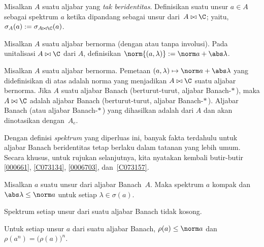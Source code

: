 \begin{defn}\label{00150014} Misalkan $A$ suatu aljabar yang \emph{tak beridentitas}. Definisikan
 suatu unsur $a \in A$ sebagai spektrum $a$ ketika dipandang sebagai unsur
dari~$A \bowtie \C$; yaitu, $\sigma_A(a) := \sigma_{A \bowtie \C}(a)$.
\end{defn}

\begin{defn}\label{00150015} Misalkan $A$ suatu aljabar bernorma (dengan atau tanpa involusi). Pada
unitalisasi $A \bowtie \C$ dari $A$, definisikan $\norm{(a,\lambda)} := \norm a + \abs\lambda$.
\end{defn}

\begin{prop}\label{001500151} Misalkan $A$ suatu aljabar bernorma. Pemetaan
$(a,\lambda) \mapsto \norm a + \abs\lambda$ yang didefinisikan di atas adalah norma yang
menjadikan $A \bowtie \C$ suatu aljabar bernorma. Jika $A$ suatu aljabar Banach (berturut-turut,
aljabar Banach-$*\,$), maka $A \bowtie \C$ adalah aljabar Banach (berturut-turut, aljabar
Banach-$*\,$). Aljabar Banach (atau aljabar Banach-$*\,$) yang dihasilkan adalah
 dari $A$ dan akan
dinotasikan dengan~$A_e$.
\end{prop}

Dengan definisi \emph{spektrum} yang diperluas ini, banyak fakta terdahulu untuk aljabar
Banach beridentitas tetap berlaku dalam tatanan yang lebih umum. Secara khusus, untuk
rujukan selanjutnya, kita nyatakan kembali butir-butir \ref{000661}, \ref{C073134},
\ref{0006703}, dan~\ref{C073157}.

\begin{prop}\label{001500157} Misalkan $a$ suatu unsur dari aljabar Banach~$A$. Maka spektrum
$a$ kompak dan $\abs\lambda \le \norm a$ untuk setiap $\lambda \in \sigma(a)$.
\end{prop}

\begin{prop}\label{00150016} Spektrum setiap unsur dari suatu aljabar Banach tidak kosong.
\end{prop}

\begin{prop}\label{00150017} Untuk setiap unsur $a$ dari suatu aljabar Banach, $\rho(a) \le
\norm a$ dan $\rho(a^n) = \bigr(\rho(a)\bigr)^n$.
\end{prop}

